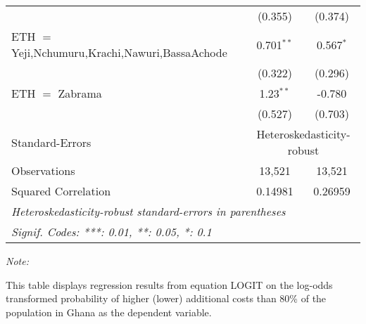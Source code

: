 \begin{table}[htbp!]
\begin{adjustbox}{width = 1\textwidth, max height = 0.95\textheight, center}
\begin{threeparttable}[b]
\begin{tabular}{lcc}
                                                                                      & (0.355)       & (0.374)\\   
            ETH $=$ Yeji,Nchumuru,Krachi,Nawuri,BassaAchode                           & 0.701$^{**}$  & 0.567$^{*}$\\   
                                                                                      & (0.322)       & (0.296)\\   
            ETH $=$ Zabrama                                                           & 1.23$^{**}$   & -0.780\\   
                                                                                      & (0.527)       & (0.703)\\   
            \midrule 
            Standard-Errors & \multicolumn{2}{c}{Heteroskedasticity-robust} \\ 
            Observations                                                              & 13,521        & 13,521\\  
            Squared Correlation                                                       & 0.14981       & 0.26959\\  
            \midrule \midrule
            \multicolumn{3}{l}{\emph{Heteroskedasticity-robust standard-errors in parentheses}}\\
            \multicolumn{3}{l}{\emph{Signif. Codes: ***: 0.01, **: 0.05, *: 0.1}}\\
         \end{tabular}
         
         \begin{tablenotes}\item \medskip \textit{Note:}
            \item This table displays regression results from equation LOGIT on the log-odds transformed probability of higher (lower) additional costs than 80\% of the population in Ghana as the dependent variable. 
         \end{tablenotes}
      \end{threeparttable}
   \end{adjustbox}
\end{table}


